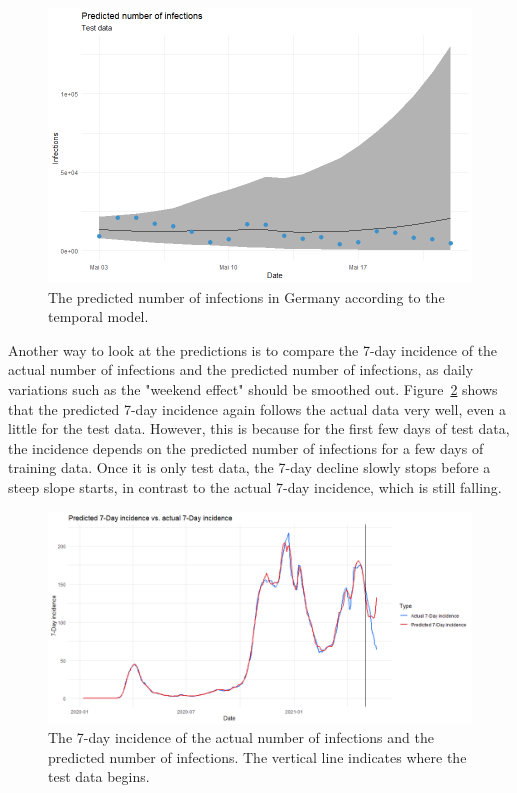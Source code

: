\begin{figure}[H]
  \centering
  \includegraphics[width = \textwidth]{predictions_2_germany.png}
  \caption{The predicted number of infections in Germany according to the temporal model.}
  \label{predictions_2_germany}
\end{figure}
Another way to look at the predictions is to compare the 7-day incidence of the actual number of infections and the predicted number of infections, as daily variations such as the "weekend effect" should be smoothed out. Figure~\ref{incidence_germany} shows that the predicted 7-day incidence again follows the actual data very well, even a little for the test data. However, this is because for the first few days of test data, the incidence depends on the predicted number of infections for a few days of training data. Once it is only test data, the 7-day decline slowly stops before a steep slope starts, in contrast to the actual 7-day incidence, which is still falling.
\begin{figure}[H]
  \centering
  \includegraphics[width = \textwidth]{incidence_germany.png}  
  \caption{The 7-day incidence of the actual number of infections and the predicted number of infections. The vertical line indicates where the test data begins.}
  \label{incidence_germany}
\end{figure}
